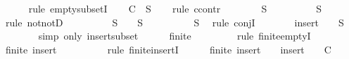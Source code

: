 \begin{isabellebody}
\ \ \ \ \isamarkupfalse%
\ {\isacharparenleft}rule\ empty{\isacharunderscore}subsetI{\isacharparenright}\isanewline
\ \ \isamarkupfalse%
\ C{}{\isacharcolon}{\isachardoublequoteopen}{\isasymbottom}\ {\isasymnotin}\ S{\isachardoublequoteclose}\isanewline
\ \ \isamarkupfalse%
\ {\isacharparenleft}rule\ ccontr{\isacharparenright}\isanewline
\ \ \ \ \isamarkupfalse%
\ {\isachardoublequoteopen}{\isasymnot}{\isacharparenleft}{\isasymbottom}\ {\isasymnotin}\ S{\isacharparenright}{\isachardoublequoteclose}\isanewline
\ \ \ \ \isamarkupfalse%
\ \isamarkupfalse%
\ {\isachardoublequoteopen}{\isasymbottom}\ {\isasymin}\ S{\isachardoublequoteclose}\isanewline
\ \ \ \ \ \ \isamarkupfalse%
\ {\isacharparenleft}rule\ notnotD{\isacharparenright}\isanewline
\ \ \ \ \isamarkupfalse%
\ \isamarkupfalse%
\ {\isachardoublequoteopen}{\isasymbottom}\ {\isasymin}\ S\ {\isasymand}\ {\isacharbraceleft}{\isacharbraceright}\ {\isasymsubseteq}\ S{\isachardoublequoteclose}\isanewline
\ \ \ \ \ \ \isamarkupfalse%
\ {\isacartoucheopen}{\isacharbraceleft}{\isacharbraceright}\ {\isasymsubseteq}\ S{\isacartoucheclose}\ \isamarkupfalse%
\ {\isacharparenleft}rule\ conjI{\isacharparenright}\isanewline
\ \ \ \ \isamarkupfalse%
\ \isamarkupfalse%
\ {\isachardoublequoteopen}insert\ {\isasymbottom}\ {\isacharbraceleft}{\isacharbraceright}\ {\isasymsubseteq}\ S{\isachardoublequoteclose}\ \isanewline
\ \ \ \ \ \ \isamarkupfalse%
\ {\isacharparenleft}simp\ only{\isacharcolon}\ insert{\isacharunderscore}subset{\isacharparenright}\isanewline
\ \ \ \ \isamarkupfalse%
\ {\isachardoublequoteopen}finite\ {\isacharbraceleft}{\isacharbraceright}{\isachardoublequoteclose}\isanewline
\ \ \ \ \ \ \isamarkupfalse%
\ {\isacharparenleft}rule\ finite{\isachardot}emptyI{\isacharparenright}\isanewline
\ \ \ \ \isamarkupfalse%
\ \isamarkupfalse%
\ {\isachardoublequoteopen}finite\ {\isacharparenleft}insert\ {\isasymbottom}\ {\isacharbraceleft}{\isacharbraceright}{\isacharparenright}{\isachardoublequoteclose}\isanewline
\ \ \ \ \ \ \isamarkupfalse%
\ {\isacharparenleft}rule\ finite{\isachardot}insertI{\isacharparenright}\isanewline
\ \ \ \ \isamarkupfalse%
\ {\isachardoublequoteopen}finite\ {\isacharparenleft}insert\ {\isasymbottom}\ {\isacharbraceleft}{\isacharbraceright}{\isacharparenright}\ {\isasymlongrightarrow}\ {\isacharparenleft}insert\ {\isasymbottom}\ {\isacharbraceleft}{\isacharbraceright}{\isacharparenright}\ {\isasymin}\ C{\isachardoublequoteclose}\isanewline

\end{isabellebody}
